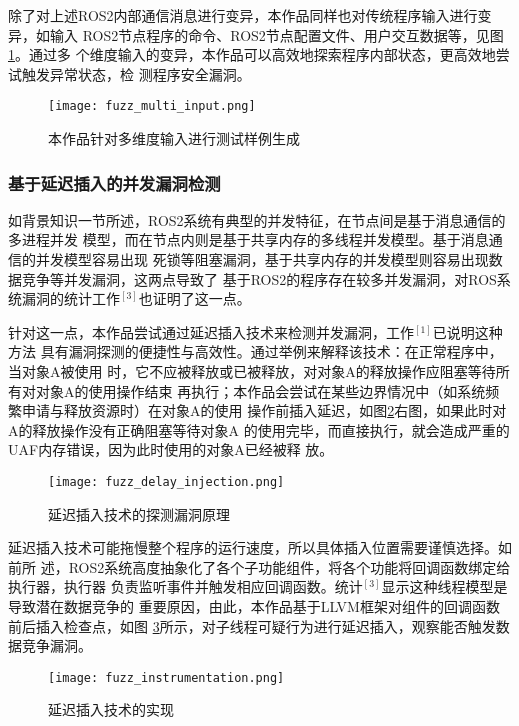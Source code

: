 除了对上述ROS2内部通信消息进行变异，本作品同样也对传统程序输入进行变异，如输入
ROS2节点程序的命令、ROS2节点配置文件、用户交互数据等，见图\ref{pic:fmi}。通过多
个维度输入的变异，本作品可以高效地探索程序内部状态，更高效地尝试触发异常状态，检
测程序安全漏洞。

\begin{figure}[h]
    \centering
    \texttt{[image: fuzz\_multi\_input.png]}
    \caption{本作品针对多维度输入进行测试样例生成}
    \label{pic:fmi}
\end{figure}

\subsubsection{基于延迟插入的并发漏洞检测}

如背景知识一节所述，ROS2系统有典型的并发特征，在节点间是基于消息通信的多进程并发
模型，而在节点内则是基于共享内存的多线程并发模型。基于消息通信的并发模型容易出现
死锁等阻塞漏洞，基于共享内存的并发模型则容易出现数据竞争等并发漏洞，这两点导致了
基于ROS2的程序存在较多并发漏洞，对ROS系统漏洞的统计工作$^{[3]}$也证明了这一点。

针对这一点，本作品尝试通过延迟插入技术来检测并发漏洞，工作$^{[1]}$已说明这种方法
具有漏洞探测的便捷性与高效性。通过举例来解释该技术：在正常程序中，当对象A被使用
时，它不应被释放或已被释放，对对象A的释放操作应阻塞等待所有对对象A的使用操作结束
再执行；本作品会尝试在某些边界情况中（如系统频繁申请与释放资源时）在对象A的使用
操作前插入延迟，如图\ref{pic:fdi}右图，如果此时对A的释放操作没有正确阻塞等待对象A
的使用完毕，而直接执行，就会造成严重的UAF内存错误，因为此时使用的对象A已经被释
放。

\begin{figure}[h]
    \centering
    \texttt{[image: fuzz\_delay\_injection.png]}
    \caption{延迟插入技术的探测漏洞原理}
    \label{pic:fdi}
\end{figure}

延迟插入技术可能拖慢整个程序的运行速度，所以具体插入位置需要谨慎选择。如前所
述，ROS2系统高度抽象化了各个子功能组件，将各个功能将回调函数绑定给执行器，执行器
负责监听事件并触发相应回调函数。统计$^{[3]}$显示这种线程模型是导致潜在数据竞争的
重要原因，由此，本作品基于LLVM框架对组件的回调函数前后插入检查点，如图
\ref{pic:fi}所示，对子线程可疑行为进行延迟插入，观察能否触发数据竞争漏洞。

\begin{figure}[h]
    \centering
    \texttt{[image: fuzz\_instrumentation.png]}
    \caption{延迟插入技术的实现}
    \label{pic:fi}
\end{figure}

